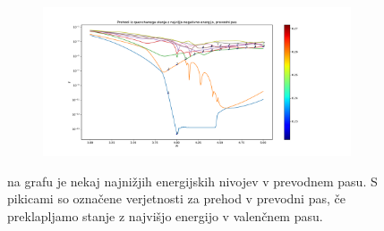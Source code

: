 \begin{figure}[H]
\centering
\begin{subfigure}{\textwidth}
\includegraphics[trim=0 0 0 64,clip,width=\linewidth]{Figures/IzEngaStanjaWBand.pdf}
\end{subfigure}
\caption{na grafu je nekaj najnižjih energijskih nivojev v prevodnem pasu. S pikicami so označene verjetnosti za prehod v prevodni pas, če preklapljamo stanje z najvišjo energijo v valenčnem pasu.}
\label{fig:IzEngaStanjaWBand}
\end{figure}


